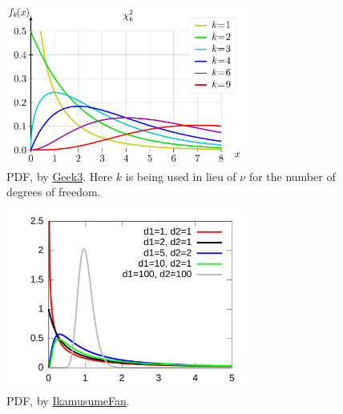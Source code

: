 \begin{figure}
\centering
\includegraphics[width=0.7\textwidth]{figures/stats/dist/chi2_pdf}
\caption{
\chiSqdist PDF,
by \href{https://en.wikipedia.org/wiki/File:Chi-square_pdf.svg}{Geek3}.
Here $k$ is being used in lieu of $\nu$ for the number of degrees of freedom.
}
\label{fig:dist:chi2}
\end{figure}

\begin{figure}
\centering
\includegraphics[width=0.7\textwidth,trim={1.5cm 0.1cm 0.1cm 0.1cm},clip]{figures/stats/dist/F_pdf}%
\caption{
\Fdist PDF,
by \href{https://en.wikipedia.org/wiki/File:F-distribution_pdf.svg}{IkamusumeFan}.
}
\label{fig:dist:F}
\end{figure}

